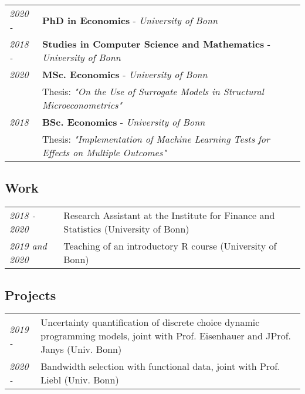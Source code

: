 \documentclass{article}
\begin{document}
\begin{table}[h!]
\renewcommand{\arraystretch}{1.4}
    \begin{tabular}{p{110pt} p{350pt}}
        \textit{2020 - } & \textbf{PhD in Economics} - \textit{University of Bonn}\\
        \textit{2018 - } &  \textbf{Studies in Computer Science and Mathematics} - \textit{University of Bonn}\\
        \textit{2020} &  \textbf{MSc. Economics} - \textit{University of Bonn} \hfill\\
        \hfill &  \vspace*{-15pt} \small Thesis: \textit{"On the Use of Surrogate Models in Structural Microeconometrics"}\\
        \textit{2018} & \textbf{BSc. Economics} - \textit{University of Bonn} \hfill\\
            \hfill &  \vspace*{-15pt} \small Thesis: \textit{"Implementation of Machine Learning Tests for Effects on Multiple Outcomes"}\\
    \end{tabular}
\end{table}


\subsection*{Work}

\begin{table}[h!]
\renewcommand{\arraystretch}{1.4}
    \begin{tabular}{p{110pt} p{350pt}}
         \textit{2018 - 2020} &  Research Assistant at the Institute for Finance and Statistics (University of Bonn) \\
         \textit{2019 and 2020} & Teaching of an introductory \textsf{R} course (University of Bonn) \\
    \end{tabular}
\end{table}


\subsection*{Projects}

\begin{table}[h!]
\renewcommand{\arraystretch}{1.4}
    \begin{tabular}{p{110pt} p{350pt}}
       \textit{2019 - } & Uncertainty quantification of discrete choice dynamic
       programming models, joint with Prof. Eisenhauer and JProf. Janys (Univ. Bonn) \\
       \textit{2020 - } & Bandwidth selection with functional data, joint with Prof. 
       Liebl (Univ. Bonn)
    \end{tabular}
\end{table}
\end{document}
